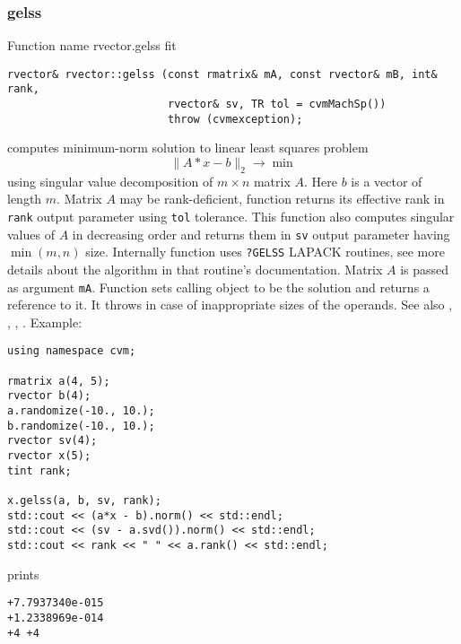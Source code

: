 \subsubsection{gelss}
Function%
\pdfdest name {rvector.gelss} fit
\begin{verbatim}
rvector& rvector::gelss (const rmatrix& mA, const rvector& mB, int& rank,
                         rvector& sv, TR tol = cvmMachSp())
                         throw (cvmexception);
\end{verbatim}
computes minimum-norm solution to linear
least squares problem 
\begin{equation*}
\|A*x-b\|_2\to\min
\end{equation*}
using singular value decomposition of $m\times n$ matrix $A$.
Here $b$ is a vector of length $m$.
Matrix $A$ may be rank-deficient,  function returns 
its effective rank in \verb"rank"
output parameter using \verb"tol" tolerance.
This function also computes
singular values of $A$ in decreasing order and returns them in \verb"sv" output parameter
having $\min(m,n)$ size.
Internally  function uses \verb"?GELSS" LAPACK routines, see more details
about the algorithm in that routine's documentation.
Matrix $A$ is passed as  argument \verb"mA".
Function sets calling object to be the solution and returns a reference to it.
It throws
in case of inappropriate sizes of the operands.
See also , 
, , 
.
Example:
\begin{Verbatim}
using namespace cvm;

rmatrix a(4, 5);
rvector b(4);
a.randomize(-10., 10.);
b.randomize(-10., 10.);
rvector sv(4);
rvector x(5);
tint rank;

x.gelss(a, b, sv, rank);
std::cout << (a*x - b).norm() << std::endl;
std::cout << (sv - a.svd()).norm() << std::endl;
std::cout << rank << " " << a.rank() << std::endl;
\end{Verbatim}
prints
\begin{Verbatim}
+7.7937340e-015
+1.2338969e-014
+4 +4
\end{Verbatim}
\newpage




